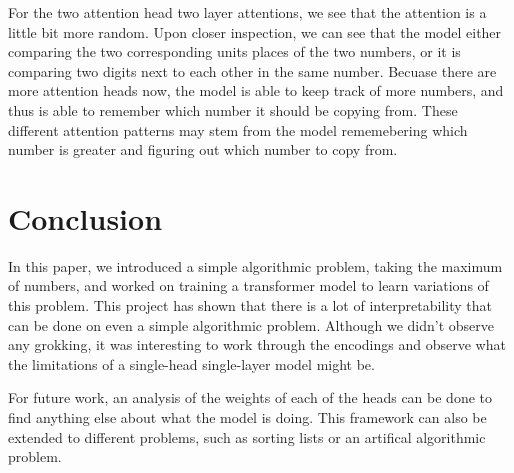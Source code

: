 \documentclass{article}
\begin{document}
For the two attention head two layer attentions, we see that the attention is a little bit more random. Upon closer inspection, we can see that the model either comparing the two corresponding units places of the two numbers, or it is comparing two digits next to each other in the same number. Becuase there are more attention heads now, the model is able to keep track of more numbers, and thus is able to remember which number it should be copying from. These different attention patterns may stem from the model rememebering which number is greater and figuring out which number to copy from. 

\section{Conclusion} 

In this paper, we introduced a simple algorithmic problem, taking the maximum of numbers, and worked on training a transformer model to learn variations of this problem. This project has shown that there is a lot of interpretability that can be done on even a simple algorithmic problem. Although we didn't observe any grokking, it was interesting to work through the encodings and observe what the limitations of a single-head single-layer model might be.

For future work, an analysis of the weights of each of the heads can be done to find anything else about what the model is doing. This framework can also be extended to different problems, such as sorting lists or an artifical algorithmic problem.

\newpage


\end{document}

